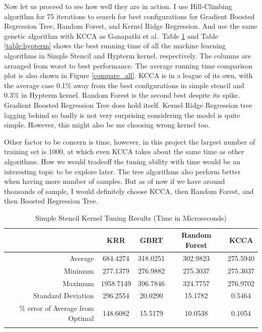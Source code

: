 Now let us proceed to see how well they are in action. I use Hill-Climbing algorithm for 75 iterations to search for best configurations for Gradient Boosted Regression Tree, Random Forest, and Kernel Ridge Regression. And use the same genetic algorithm with KCCA as Ganapathi et al.\ Table \ref{table:simple} and Table \ref{table:hypterm} shows the best running time of all the machine learning algorithms in Simple Stencil and Hypterm kernel, respectively. The columns are arranged from worst to best performance. The average running time comparison plot is also shown in Figure \ref{compare_all}. KCCA is in a league of its own, with the average case 0.1\% away from the best configurations in simple stencil and 0.3\% in Hypterm kernel. Random Forest is the second best despite its spike. Gradient Boosted Regression Tree does hold itself. Kernel Ridge Regression tree lagging behind so badly is not very surprising considering the model is quite simple. However, this might also be me choosing wrong kernel too.

Other factor to be concern is time, however, in this project the largest number of training set is 1000, at which even KCCA takes about the same time as other algorithms. How we would tradeoff the tuning ability with time would be an interesting topic to be explore later. The tree algorithms also perform better when having more number of samples. But as of now if we have around thousands of sample, I would definitely choose KCCA, then Random Forest, and then Boosted Regression Tree.

\begin{table}[h]
\caption{Simple Stencil Kernel Tuning Results (Time in Microseconds)}
\center
\begin{tabular}{r c c c c}
\hline
 & KRR	& GBRT	& Random Forest	& KCCA \\
\hline\hline
Average	& 684.4274	& 318.0251	& 302.9823	& 275.5940 \\
Minimum	& 277.1379	& 276.9882	& 275.3037	& 275.3037 \\
Maximum	& 1958.7149	& 396.7846	& 324.7757	& 276.9702 \\
Standard Deviation	& 296.2554	& 20.0290	& 15.1782	& 0.5464 \\
\% error of Average from Optimal	& 148.6082	& 15.5179	& 10.0538	& 0.1054 \\
\hline
\label{tbl:simple}
\end{tabular}
\label{table:simple}
\end{table}

